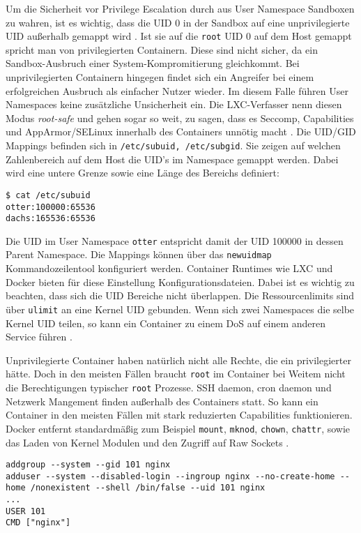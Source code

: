 Um die Sicherheit vor Privilege Escalation durch aus User Namespace Sandboxen zu wahren, ist es wichtig, dass die UID 0 in der Sandbox auf eine unprivilegierte UID außerhalb gemappt wird \cite{lxc-sec, stgraber-unpriv}. Ist sie auf die \texttt{root} UID 0 auf dem Host gemappt spricht man von privilegierten Containern. Diese sind nicht sicher, da ein Sandbox-Ausbruch einer System-Kompromitierung gleichkommt.
Bei unprivilegierten Containern hingegen findet sich ein Angreifer bei einem erfolgreichen Ausbruch als einfacher Nutzer wieder. Im diesem Falle führen User Namespaces keine zusätzliche Unsicherheit ein. Die LXC-Verfasser nenn diesen Modus \textit{root-safe} und gehen sogar so weit, zu sagen, dass es Seccomp, Capabilities und AppArmor/SELinux innerhalb des Containers unnötig macht \cite{lxc-sec}. Die UID/GID Mappings befinden sich in \texttt{/etc/subuid, /etc/subgid}. Sie zeigen auf welchen
Zahlenbereich auf dem Host die UID's im Namespace gemappt werden. Dabei wird eine untere Grenze sowie eine Länge des Bereichs definiert:

\begin{lstlisting}
$ cat /etc/subuid
otter:100000:65536
dachs:165536:65536
\end{lstlisting}

Die UID im User Namespace \texttt{otter} entspricht damit der UID 100000 in dessen Parent Namespace. Die Mappings können über das \texttt{newuidmap} Kommandozeilentool konfiguriert werden. Container Runtimes wie LXC und Docker bieten für diese Einstellung Konfigurationsdateien. Dabei ist es wichtig zu beachten, dass sich die UID Bereiche nicht überlappen. Die Ressourcenlimits sind über \texttt{ulimit} an eine Kernel UID gebunden. Wenn sich zwei Namespaces die selbe Kernel UID teilen,
so kann ein Container zu einem DoS auf einem anderen Service führen \cite{lxc-sec}.

Unprivilegierte Container haben natürlich nicht alle Rechte, die ein privilegierter hätte. Doch in den meisten Fällen braucht \texttt{root} im Container bei Weitem nicht die Berechtigungen typischer \texttt{root} Prozesse. SSH daemon, cron daemon und Netzwerk Mangement finden außerhalb des Containers statt. So kann ein Container in den meisten Fällen mit stark reduzierten Capabilities funktionieren. Docker entfernt standardmäßig zum Beispiel \texttt{mount}, \texttt{mknod}, \texttt{chown},
\texttt{chattr}, sowie das Laden von Kernel Modulen und den Zugriff auf Raw Sockets \cite{docker-sec}.

\begin{lstlisting}[caption={Ein Beispiel Dockerfile für einen NGINX Web Server der nicht als \texttt{root} im Container läuft}]
addgroup --system --gid 101 nginx 
adduser --system --disabled-login --ingroup nginx --no-create-home --home /nonexistent --shell /bin/false --uid 101 nginx
...
USER 101
CMD ["nginx"]
\end{lstlisting}

